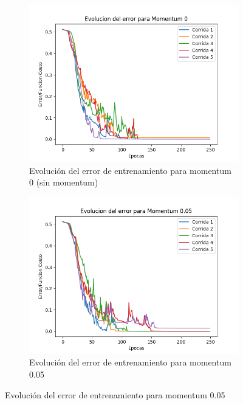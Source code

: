 \begin{figure}[!htbp]
\centering
\begin{subfigure}{.5\textwidth}
  \centering
  \includegraphics[width=1\linewidth]{graficos/momentum_0.png}
  \caption{Evolución del error de entrenamiento para momentum 0 (sin momentum)}
  \label{fig:sub1}
\end{subfigure}%
\begin{subfigure}{.5\textwidth}
  \centering
  \includegraphics[width=1\linewidth]{graficos/momentum_0_05.png}
  \caption{Evolución del error de entrenamiento para momentum 0.05}
  \label{fig:sub2}
\end{subfigure}
\end{figure}

